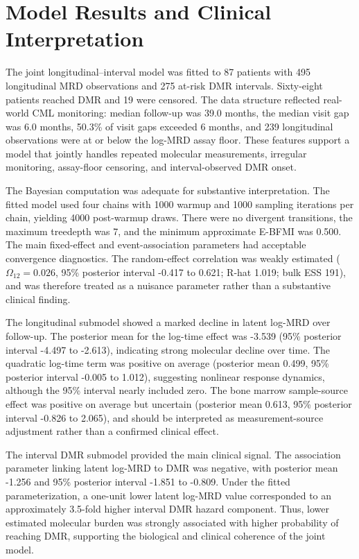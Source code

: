 \section{Model Results and Clinical Interpretation}

The joint longitudinal--interval model was fitted to 87 patients with 495 longitudinal MRD observations and 275 at-risk DMR intervals. Sixty-eight patients reached DMR and 19 were censored. The data structure reflected real-world CML monitoring: median follow-up was 39.0 months, the median visit gap was 6.0 months, 50.3\% of visit gaps exceeded 6 months, and 239 longitudinal observations were at or below the log-MRD assay floor. These features support a model that jointly handles repeated molecular measurements, irregular monitoring, assay-floor censoring, and interval-observed DMR onset.

The Bayesian computation was adequate for substantive interpretation. The fitted model used four chains with 1000 warmup and 1000 sampling iterations per chain, yielding 4000 post-warmup draws. There were no divergent transitions, the maximum treedepth was 7, and the minimum approximate E-BFMI was 0.500. The main fixed-effect and event-association parameters had acceptable convergence diagnostics. The random-effect correlation was weakly estimated (\(\Omega_{12}=0.026\), 95\% posterior interval -0.417 to 0.621; R-hat 1.019; bulk ESS 191), and was therefore treated as a nuisance parameter rather than a substantive clinical finding.

The longitudinal submodel showed a marked decline in latent log-MRD over follow-up. The posterior mean for the log-time effect was -3.539 (95\% posterior interval -4.497 to -2.613), indicating strong molecular decline over time. The quadratic log-time term was positive on average (posterior mean 0.499, 95\% posterior interval -0.005 to 1.012), suggesting nonlinear response dynamics, although the 95\% interval nearly included zero. The bone marrow sample-source effect was positive on average but uncertain (posterior mean 0.613, 95\% posterior interval -0.826 to 2.065), and should be interpreted as measurement-source adjustment rather than a confirmed clinical effect.

The interval DMR submodel provided the main clinical signal. The association parameter linking latent log-MRD to DMR was negative, with posterior mean -1.256 and 95\% posterior interval -1.851 to -0.809. Under the fitted parameterization, a one-unit lower latent log-MRD value corresponded to an approximately 3.5-fold higher interval DMR hazard component. Thus, lower estimated molecular burden was strongly associated with higher probability of reaching DMR, supporting the biological and clinical coherence of the joint model.

